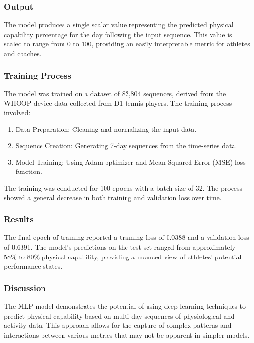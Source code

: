 \documentclass[manuscript,acmsmall,anonymous,review,screen,nonacm=true, authorversion=true]{acmart}
\begin{document}
  \subsubsection{Output}

  The model produces a single scalar value representing the predicted physical capability percentage for the day following the input sequence. This value is scaled to range from 0 to 100, providing an easily interpretable metric for athletes and coaches.

  \subsubsection{Training Process}

  The model was trained on a dataset of 82,804 sequences, derived from the WHOOP device data collected from D1 tennis players. The training process involved:

  \begin{enumerate}
    \item Data Preparation: Cleaning and normalizing the input data.
    \item Sequence Creation: Generating 7-day sequences from the time-series data.
    \item Model Training: Using Adam optimizer and Mean Squared Error (MSE) loss function.
  \end{enumerate}

  The training was conducted for 100 epochs with a batch size of 32. The process showed a general decrease in both training and validation loss over time.

  \subsubsection{Results}

  The final epoch of training reported a training loss of 0.0388 and a validation loss of 0.6391. The model's predictions on the test set ranged from approximately 58\% to 80\% physical capability, providing a nuanced view of athletes' potential performance states.

  \subsubsection{Discussion}

  The MLP model demonstrates the potential of using deep learning techniques to predict physical capability based on multi-day sequences of physiological and activity data. This approach allows for the capture of complex patterns and interactions between various metrics that may not be apparent in simpler models.
\end{document}
